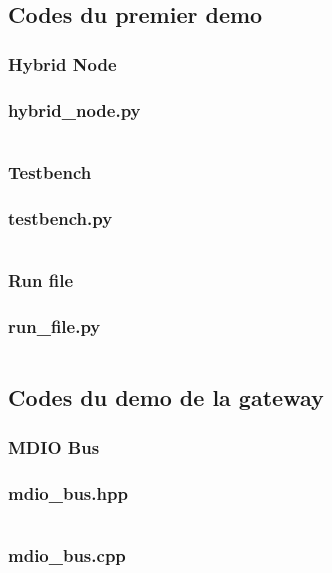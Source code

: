 \subsection{Codes du premier demo}

\subsubsection{Hybrid Node}
\label{anexe:first_demo:hybrid_node}
\subsubsection*{hybrid\_node.py}
\inputminted[autogobble]{python}{anexes/first_demo/hybrid_node.py}

\subsubsection{Testbench}
\label{anexe:first_demo:testbench}
\subsubsection*{testbench.py}
\inputminted[autogobble]{python}{anexes/first_demo/testbench.py}

\subsubsection{Run file}
\label{anexe:first_demo:run_file}
\subsubsection*{run\_file.py}
\inputminted[autogobble]{python}{anexes/first_demo/run_microsar.py}


\subsection{Codes du demo de la gateway}

\subsubsection{MDIO Bus}
\label{anexe:gw_demo:mdio_bus}
\subsubsection*{mdio\_bus.hpp}
\inputminted[autogobble]{c++}{anexes/Gw_demo/mdio_bus.hpp}
\subsubsection*{mdio\_bus.cpp}
\inputminted[autogobble]{c++}{anexes/Gw_demo/mdio_bus.cpp}

